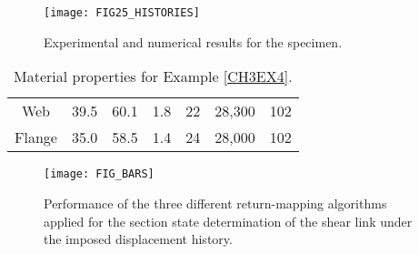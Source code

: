  

\begin{figure}[H]
	\centering
	\texttt{[image: FIG25\_HISTORIES]}
	\caption{Experimental and numerical results for the specimen.}
	\label{fig:FIG25}
\end{figure}

\begin{table}
	\centering
	\begin{minipage}{0.8\linewidth}
		\caption{Material properties for Example \ref{CH3EX4}.}
		\begin{tabular}{ccccccc}
			\toprule\toprule
			\vtop{\hbox{\strut \hspace{.25cm}Section}\hbox{\strut W 
			$18\times40$}} 
			& \vtop{\hbox{\strut \hspace{0.5cm}$\sigma_y$}\hbox{\strut 
					($\text{kips}^{}/\text{in}^2$)}}  &         
					\vtop{\hbox{\strut 
					\hspace{0.5cm}$\sigma_u$}\hbox{\strut 
					($\text{kips}^{}/\text{in}^2$)}} &
			\vtop{\hbox{\strut \hspace{2.5pt}$\epsilon_y$}\hbox{\strut (\%)}} & 
			\vtop{\hbox{\strut \hspace{2.5pt}$\epsilon_u$}\hbox{\strut (\%)}} 
			&\vtop{\hbox{\strut \hspace{0.5cm}$E$}\hbox{\strut 
					($\text{kips}^{}/\text{in}^2$)}} & \vtop{\hbox{\strut 
					\hspace{0.4cm}$H_{kin}$}\hbox{\strut 
					($\text{kips}^{}/\text{in}^2$)}} \\
			\midrule
			Web & 39.5 & 60.1 & 1.8 & 22 & 28,300 & 102 \\
			Flange & 35.0 & 58.5 & 1.4 & 24 & 28,000 & 102\\
			\bottomrule\bottomrule
		\end{tabular}
		\label{table:TABLE6}
	\end{minipage}
\end{table}

\begin{figure}[H]
	\centering
	\texttt{[image: FIG\_BARS]}
	\caption{Performance of the three different return-mapping algorithms 
		applied for the section state determination of the shear link under the 
		imposed displacement history.}
	\label{fig:FIG_BARS}
\end{figure}

\clearpage

